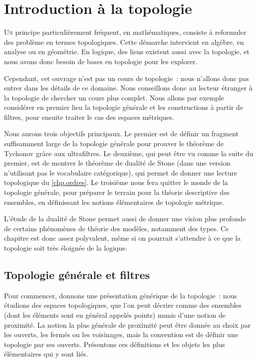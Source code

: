\chapter[Topologie]{Introduction à la topologie}
\label{chp.topo}

\minitoc

\lettrine{U}{n} principe particulièrement fréquent, en mathématiques, consiste
à reformuler des problème en termes topologiques.
Cette démarche intervient en algèbre, en analyse ou en géométrie. En logique,
des liens existent aussi avec la topologie, et nous avons donc besoin de bases
en topologie pour les explorer.

Cependant, cet ouvrage n'est pas un cours de topologie~: nous n'allons donc pas
entrer dans les détails de ce domaine. Nous conseillons donc au lecteur étranger
à la topologie de chercher un cours plus complet. Nous allons par exemple
considérer en premier lieu la topologie générale et les constructions à partir
de filtres, pour ensuite traiter le cas des espaces métriques.

Nous aurons trois objectifs principaux.
Le premier est de définir un fragment suffisamment large de la topologie
générale pour prouver le théorème de Tychonov grâce aux ultrafiltres.
Le deuxième, qui peut être vu comme la suite du premier, est de montrer le
théorème de dualité de Stone (dans une version n'utilisant pas le vocabulaire
catégorique), qui permet de donner une lecture topologique du \cref{chp.ordres}.
Le troisième nous fera quitter le monde de la topologie générale, pour préparer
le terrain pour la théorie descriptive des ensembles, en définissant les notions
élémentaires de topologie métrique.

L'étude de la dualité de Stone permet aussi de donner une vision plus profonde
de certains phénomènes de théorie des modèles, notamment des types. Ce chapitre
est donc assez polyvalent, même si on pourrait s'attendre à ce que la topologie
soit très éloignée de la logique.

\section{Topologie générale et filtres}

Pour commencer, donnons une présentation générique de la topologie~: nous
étudions des espaces topologiques, que l'on peut décrire comme des ensembles
(dont les éléments sont en général appelés \og points\fg{}) munis d'une notion
de proximité. La notion la plus générale de proximité peut être donnée au choix
par les ouverts, les fermés ou les voisinages, mais la convention est de définir
une topologie par ses ouverts. Présentons ces définitions et les objets les
plus élémentaires qui y sont liés.

